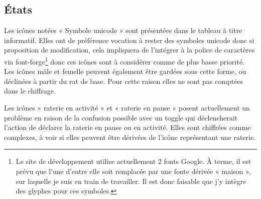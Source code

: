 \documentclass[a4paper,10pt]{article}
\begin{document}
\subsection{\'Etats}

Les icônes notées « Symbole unicode » sont présentées dans le tableau à titre informatif. Elles ont de préférence vocation à rester des symboles unicode donc si proposition de modification, cela impliquera de l'intégrer à la police de caractères via font-forge\footnote{Le site de développement utilise actuellement 2 fonts Google. \`A terme, il est prévu que l'une d'entre elle soit remplacée par une fonte dérivée « maison », sur laquelle je suis en train de travailler. Il est donc faisable que j'y intègre des glyphes pour ces symboles.} donc ces icônes sont à considérer comme de plus basse priorité. Les icônes mâle et femelle peuvent également être gardées sous cette forme, ou déclinées à partir du rat de base. Pour cette raison elles ne sont pas comptées dans le chiffrage.

Les icônes « raterie en activité »  et « raterie en pause » posent actuellement un problème en raison de la confusion possible avec un toggle qui déclencherait l'action de déclarer la raterie en pause ou en activité. Elles sont chiffrées comme complexes, à voir si elles peuvent être dérivées de l'icône représentant une raterie.  
\end{document}
